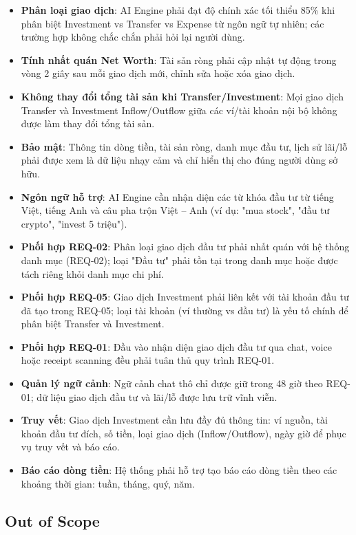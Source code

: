 \begin{itemize}
\item \textbf{Phân loại giao dịch}: AI Engine phải đạt độ chính xác tối thiểu 85\% khi phân biệt Investment vs Transfer vs Expense từ ngôn ngữ tự nhiên; các trường hợp không chắc chắn phải hỏi lại người dùng.
\item \textbf{Tính nhất quán Net Worth}: Tài sản ròng phải cập nhật tự động trong vòng 2 giây sau mỗi giao dịch mới, chỉnh sửa hoặc xóa giao dịch.
\item \textbf{Không thay đổi tổng tài sản khi Transfer/Investment}: Mọi giao dịch Transfer và Investment Inflow/Outflow giữa các ví/tài khoản nội bộ không được làm thay đổi tổng tài sản.
\item \textbf{Bảo mật}: Thông tin dòng tiền, tài sản ròng, danh mục đầu tư, lịch sử lãi/lỗ phải được xem là dữ liệu nhạy cảm và chỉ hiển thị cho đúng người dùng sở hữu.
\item \textbf{Ngôn ngữ hỗ trợ}: AI Engine cần nhận diện các từ khóa đầu tư từ tiếng Việt, tiếng Anh và câu pha trộn Việt – Anh (ví dụ: "mua stock", "đầu tư crypto", "invest 5 triệu").
\item \textbf{Phối hợp REQ-02}: Phân loại giao dịch đầu tư phải nhất quán với hệ thống danh mục (REQ-02); loại "Đầu tư" phải tồn tại trong danh mục hoặc được tách riêng khỏi danh mục chi phí.
\item \textbf{Phối hợp REQ-05}: Giao dịch Investment phải liên kết với tài khoản đầu tư đã tạo trong REQ-05; loại tài khoản (ví thường vs đầu tư) là yếu tố chính để phân biệt Transfer và Investment.
\item \textbf{Phối hợp REQ-01}: Đầu vào nhận diện giao dịch đầu tư qua chat, voice hoặc receipt scanning đều phải tuân thủ quy trình REQ-01.
\item \textbf{Quản lý ngữ cảnh}: Ngữ cảnh chat thô chỉ được giữ trong 48 giờ theo REQ-01; dữ liệu giao dịch đầu tư và lãi/lỗ được lưu trữ vĩnh viễn.
\item \textbf{Truy vết}: Giao dịch Investment cần lưu đầy đủ thông tin: ví nguồn, tài khoản đầu tư đích, số tiền, loại giao dịch (Inflow/Outflow), ngày giờ để phục vụ truy vết và báo cáo.
\item \textbf{Báo cáo dòng tiền}: Hệ thống phải hỗ trợ tạo báo cáo dòng tiền theo các khoảng thời gian: tuần, tháng, quý, năm.
\end{itemize}
\subsection{Out of Scope}

